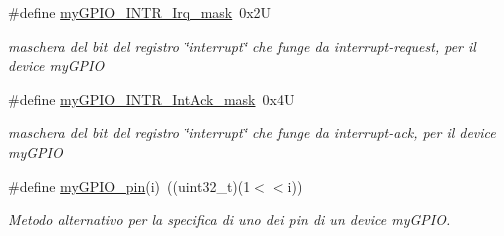 \begin{DoxyCompactItemize}
\#define \hyperlink{group__my_g_p_i_o_ga4cd02635783bc2a4ad7639cfb9fdb698}{my\+G\+P\+I\+O\+\_\+\+I\+N\+T\+R\+\_\+\+Irq\+\_\+mask}~0x2\+U
\begin{DoxyCompactList}\small\item\em maschera del bit del registro \char`\"{}interrupt\char`\"{} che funge da interrupt-\/request, per il device my\+G\+P\+I\+O \end{DoxyCompactList}\item 
\#define \hyperlink{group__my_g_p_i_o_gaa760b8397e6372e48c1008c2ba8d7387}{my\+G\+P\+I\+O\+\_\+\+I\+N\+T\+R\+\_\+\+Int\+Ack\+\_\+mask}~0x4\+U
\begin{DoxyCompactList}\small\item\em maschera del bit del registro \char`\"{}interrupt\char`\"{} che funge da interrupt-\/ack, per il device my\+G\+P\+I\+O \end{DoxyCompactList}\item 
\#define \hyperlink{group__my_g_p_i_o_gabbe2491a3b71c292521025b7b382b971}{my\+G\+P\+I\+O\+\_\+pin}(i)~((uint32\+\_\+t)(1$<$$<$i))
\begin{DoxyCompactList}\small\item\em Metodo alternativo per la specifica di uno dei pin di un device my\+G\+P\+I\+O. \end{DoxyCompactList}\end{DoxyCompactItemize}
